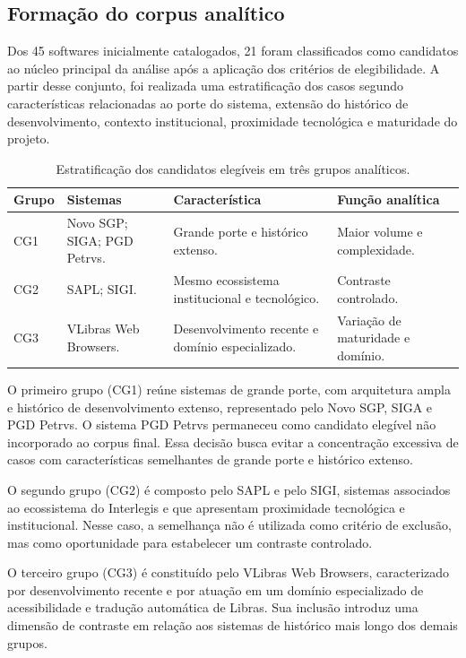 \documentclass[12pt]{article}
\begin{document}
\subsection{Formação do corpus analítico}

Dos 45 softwares inicialmente catalogados, 21 foram classificados como candidatos ao núcleo principal da análise após a aplicação dos critérios de elegibilidade. A partir desse conjunto, foi realizada uma estratificação dos casos segundo características relacionadas ao porte do sistema, extensão do histórico de desenvolvimento, contexto institucional, proximidade tecnológica e maturidade do projeto.

\begin{table}[H]
\centering
\caption{Estratificação dos candidatos elegíveis em três grupos analíticos.}
\label{tab:estratificacao}
\small
\begin{tabular}{|p{1cm}|p{2.0cm}|p{3.0cm}|p{3.0cm}|}
\hline
\textbf{Grupo} & \textbf{Sistemas} & \textbf{Característica} & \textbf{Função analítica} \\
\hline
CG1 & Novo SGP; SIGA; PGD Petrvs. &
Grande porte e histórico extenso. &
Maior volume e complexidade. \\
\hline
CG2 & SAPL; SIGI. &
Mesmo ecossistema institucional e tecnológico. &
Contraste controlado. \\
\hline
CG3 & VLibras Web Browsers. &
Desenvolvimento recente e domínio especializado. &
Variação de maturidade e domínio. \\
\hline
\end{tabular}
\end{table}

O primeiro grupo (CG1) reúne sistemas de grande porte, com arquitetura ampla e histórico de desenvolvimento extenso, representado pelo Novo SGP, SIGA e PGD Petrvs. O sistema PGD Petrvs permaneceu como candidato elegível não incorporado ao corpus final. Essa decisão busca evitar a concentração excessiva de casos com características semelhantes de grande porte e histórico extenso.

O segundo grupo (CG2) é composto pelo SAPL e pelo SIGI, sistemas associados ao ecossistema do Interlegis e que apresentam proximidade tecnológica e institucional. Nesse caso, a semelhança não é utilizada como critério de exclusão, mas como oportunidade para estabelecer um contraste controlado.

O terceiro grupo (CG3) é constituído pelo VLibras Web Browsers, caracterizado por desenvolvimento recente e por atuação em um domínio especializado de acessibilidade e tradução automática de Libras. Sua inclusão introduz uma dimensão de contraste em relação aos sistemas de histórico mais longo dos demais grupos.
\end{document}
